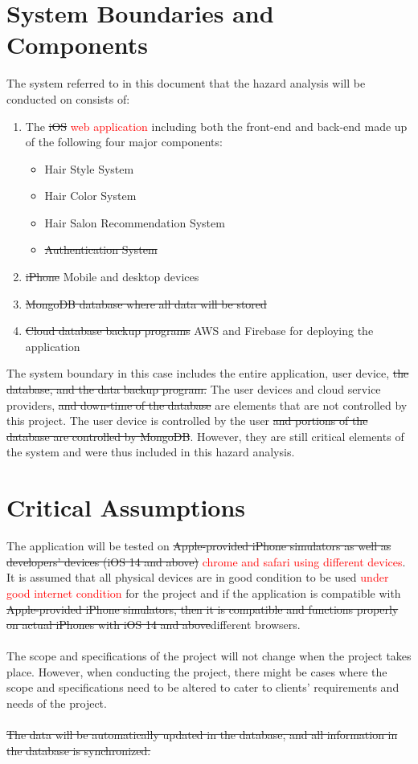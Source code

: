 \documentclass{article}
\begin{document}
\section{System Boundaries and Components}
The system referred to in this document that the hazard analysis will be conducted on consists of:
\begin{enumerate}
    \item The \sout{iOS} \textcolor{red}{web application} including both the front-end and back-end made up of the following four major components:
    \begin{itemize}
        \item Hair Style System
        \item Hair Color System
        \item Hair Salon Recommendation System
        \item \sout{Authentication System   }    
    \end{itemize}
    \item \sout{iPhone} Mobile and desktop devices
    \item \sout{MongoDB database where all data will be stored}
    \item \sout{Cloud database backup programs} AWS and Firebase for deploying the application
\end{enumerate}

\noindent The system boundary in this case includes the entire application, user device, \sout{the database, and the data backup program.} The user devices and cloud service providers, \sout{and down-time of the database} are elements that are not controlled by this project. The user device is controlled by the user \sout{and portions of the database are controlled by MongoDB}. However, they are still critical elements of the system and were thus included in this hazard analysis.

\section{Critical Assumptions}
The application will be tested on \sout{Apple-provided iPhone simulators as well as developers' devices (iOS 14 and above)} \textcolor{red}{chrome and safari using different devices}. It is assumed that all physical devices are in good condition to be used \textcolor{red}{under good internet condition} for the project and if the application is compatible with \sout{Apple-provided iPhone simulators, then it is compatible and functions properly on actual iPhones with iOS 14 and above}different browsers.\\
\\
\noindent The scope and specifications of the project will not change when the project takes place. However, when conducting the project, there might be cases where the scope and specifications need to be altered to cater to clients' requirements and needs of the project.\\
\\
\noindent \sout{The data will be automatically updated in the database, and all information in the database is synchronized.}
\end{document}
